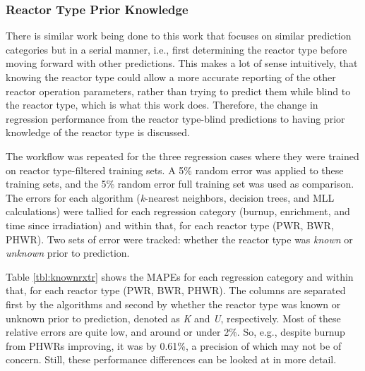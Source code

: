 \subsubsection{Reactor Type Prior Knowledge}

There is similar work being done  to this work that
focuses on similar prediction categories but in a serial manner, i.e., first
determining the reactor type before moving forward with other predictions.
This makes a lot of sense intuitively, that knowing the reactor type could
allow a more accurate reporting of the other reactor operation parameters,
rather than trying to predict them while blind to the reactor type, which is
what this work does. Therefore, the change in regression performance from the
reactor type-blind predictions to having prior knowledge of the reactor type is
discussed.

The workflow was repeated for the three regression cases where they were
trained on reactor type-filtered training sets. A 5\% random error was applied
to these training sets, and the 5\% random error full training set was used as
comparison. The errors for each algorithm (\textit{k}-nearest neighbors,
decision trees, and \gls{MLL} calculations) were tallied for each regression
category (burnup, enrichment, and time since irradiation) and within that, for
each reactor type (\gls{PWR}, \gls{BWR}, \gls{PHWR}). Two sets of error were
tracked: whether the reactor type was \textit{known} or \textit{unknown} prior
to prediction.

Table \ref{tbl:knownrxtr} shows the \gls{MAPE}s for each regression category
and within that, for each reactor type (\gls{PWR}, \gls{BWR}, \gls{PHWR}).  The
columns are separated first by the algorithms and second by whether the reactor
type was known or unknown prior to prediction, denoted as \textit{K} and
\textit{U}, respectively. Most of these relative errors are quite low, and
around or under 2\%.  So, e.g., despite burnup from \gls{PHWR}s improving, it
was by 0.61\%, a precision of which may not be of concern. Still, these
performance differences can be looked at in more detail.  

